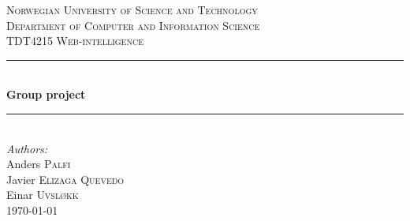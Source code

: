 \documentclass[11pt,a4paper]{report}
\newcommand{\HRule}{\rule{\linewidth}{0.5mm}}
\begin{document}
\begin{titlepage}
\center
\textsc{\Large Norwegian University of Science and Technology}\\[1.5cm]
\textsc{\large Department of Computer and Information Science}\\[0.5cm]
\textsc{TDT4215 Web-intelligence}\\[0.5cm]

\HRule \\[0.5cm]
{\huge \bfseries Group project}\\[0.2cm]
\HRule \\[1.5cm]

\Large \emph{Authors:}\\
Anders \textsc{Palfi}\\
Javier \textsc{Elizaga Quevedo}\\
Einar \textsc{Uvsløkk}\\[3cm]

{\large \today}\\[3cm]

\vfill

\end{titlepage}

\tableofcontents














\end{document}
